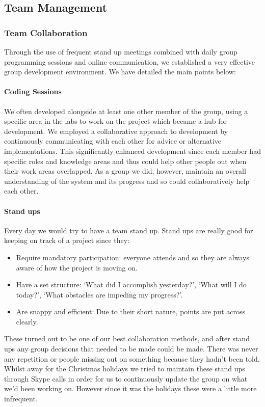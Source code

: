 \subsection{Team Management}
  \subsubsection{Team Collaboration}

    Through the use of frequent stand up meetings combined with daily group programming sessions and online communication, we established a very effective group development environment. We have detailed the main points below:

    \paragraph{Coding Sessions} We often developed alongside at least one other member of the group, using a specific area in the labs to work on the project which became a hub for development. We employed a collaborative approach to development by continuously communicating with each other for advice or alternative implementations. This significantly enhanced development since each member had specific roles and knowledge areas and thus could help other people out when their work areas overlapped. As a group we did, however, maintain an overall understanding of the system and its progress and so could collaboratively help each other.

    \paragraph{Stand ups} Every day we would try to have a team stand up. Stand ups are really good for keeping on track of a project since they:
    \begin{itemize}
        \item Require mandatory participation: everyone attends and so they are always aware of how the project is moving on.
        \item Have a set structure: `What did I accomplish yesterday?', `What will I do today?', `What obstacles are impeding my progress?'.
        \item Are snappy and efficient: Due to their short nature, points are put across clearly.
    \end{itemize}
    These turned out to be one of our best collaboration methods, and after stand ups any group decisions that needed to be made could be made. There was never any repetition or people missing out on something because they hadn't been told.
    Whilst away for the Christmas holidays we tried to maintain these stand ups through Skype\cite{skype} calls in order for us to continuously update the group on what we'd been working on. However since it was the holidays these were a little more infrequent.

